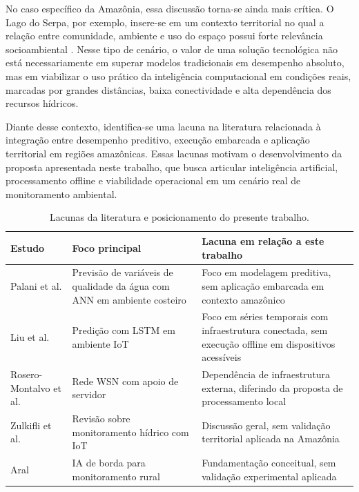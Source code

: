 No caso espec\'ifico da Amaz\^onia, essa discuss\~ao torna-se ainda mais cr\'itica. O Lago do Serpa, por exemplo, insere-se em um contexto territorial no qual a rela\c{c}\~ao entre comunidade, ambiente e uso do espa\c{c}o possui forte relev\^ancia socioambiental \cite{nogueira2022}. Nesse tipo de cen\'ario, o valor de uma solu\c{c}\~ao tecnol\'ogica n\~ao est\'a necessariamente em superar modelos tradicionais em desempenho absoluto, mas em viabilizar o uso pr\'atico da intelig\^encia computacional em condi\c{c}\~oes reais, marcadas por grandes dist\^ancias, baixa conectividade e alta depend\^encia dos recursos h\'idricos.

Diante desse contexto, identifica-se uma lacuna na literatura relacionada \`a integra\c{c}\~ao entre desempenho preditivo, execu\c{c}\~ao embarcada e aplica\c{c}\~ao territorial em regi\~oes amaz\^onicas. Essas lacunas motivam o desenvolvimento da proposta apresentada neste trabalho, que busca articular intelig\^encia artificial, processamento offline e viabilidade operacional em um cen\'ario real de monitoramento ambiental.

\begin{table}[H]
\centering
\footnotesize
\setlength{\tabcolsep}{4pt}
\caption{Lacunas da literatura e posicionamento do presente trabalho.}
\label{tab:gaps_literatura}
\tabelafonte
\begin{tabular}{p{2.8cm}p{4.7cm}p{4.7cm}}
\toprule
Estudo & Foco principal & Lacuna em rela\c{c}\~ao a este trabalho \\
\midrule
Palani et al. \cite{palani2008} & Previs\~ao de vari\'aveis de qualidade da \'agua com ANN em ambiente costeiro & Foco em modelagem preditiva, sem aplica\c{c}\~ao embarcada em contexto amaz\^onico \\
Liu et al. \cite{liu2019} & Predi\c{c}\~ao com LSTM em ambiente IoT & Foco em s\'eries temporais com infraestrutura conectada, sem execu\c{c}\~ao offline em dispositivos acess\'iveis \\
Rosero-Montalvo et al. \cite{rosero2020} & Rede WSN com apoio de servidor & Depend\^encia de infraestrutura externa, diferindo da proposta de processamento local \\
Zulkifli et al. \cite{zulkifli2022} & Revis\~ao sobre monitoramento h\'idrico com IoT & Discuss\~ao geral, sem valida\c{c}\~ao territorial aplicada na Amaz\^onia \\
Aral \cite{aral2024} & IA de borda para monitoramento rural & Fundamenta\c{c}\~ao conceitual, sem valida\c{c}\~ao experimental aplicada \\
\bottomrule
\end{tabular}
\end{table}